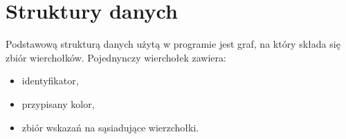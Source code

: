 \section{Struktury danych}
Podstawową strukturą danych użytą w programie jest graf, na który składa się zbiór wierchołków.
Pojednynczy wierchołek zawiera:
\begin{itemize}
 \item identyfikator,
 \item przypisany kolor,
 \item zbiór wskazań na sąsiadujące wierzchołki.
\end{itemize}
